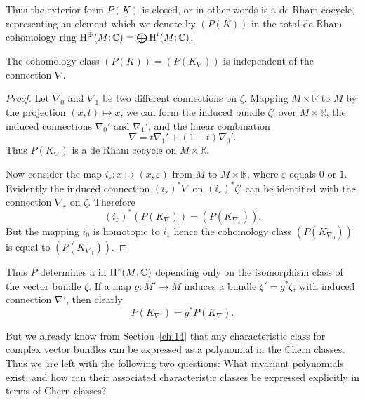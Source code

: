 \documentclass[../main]{subfiles}
\begin{document}
Thus the exterior form $P(K)$ is closed, or in other words is a de Rham cocycle, representing an element which we denote by $(P(K))$ in the total de Rham cohomology ring $\operatorname{H}^\oplus(M; \mathbb C) = \bigoplus \operatorname{H}^i(M; \mathbb C)$.

\begin{corollary}
The cohomology class $(P(K)) = (P(K_\nabla))$ is independent of the connection $\nabla$.
\end{corollary}

\begin{proof}
Let $\nabla_0$ and $\nabla_1$ be two different connections on $\zeta$. Mapping $M \times \mathbb R$ to $M$ by the projection $(x, t) \mapsto x$, we can form the induced bundle $\zeta'$ over $M \times \mathbb R$, the induced connections $\nabla_0'$ and $\nabla_1'$, and the linear combination \[\nabla = t \nabla_1' + (1 - t) \nabla_0'.\] Thus $P(K_\nabla)$ is a de Rham cocycle on $M \times \mathbb R$. 

Now consider the map $i_\varepsilon : x \mapsto (x, \varepsilon)$ from $M$ to $M \times \mathbb R$, where $\varepsilon$ equals $0$ or $1$. Evidently the induced connection $(i_\varepsilon)^\ast \nabla$ on $(i_\varepsilon)^\ast \zeta'$ can be identified with the connection $\nabla_\varepsilon$ on $\zeta$. Therefore \[(i_\varepsilon)^\ast (P(K_\nabla)) = (P(K_{\nabla_\varepsilon})).\] But the mapping $i_0$ is homotopic to $i_1$ hence the cohomology class $(P(K_{\nabla_0}))$ is equal to $(P(K_{\nabla_1}))$.
\end{proof}

Thus $P$ determines a  in $\operatorname{H}^\ast(M; \mathbb C)$ depending only on the isomorphism class of the vector bundle $\zeta$. If a map $g : M' \longrightarrow M$ induces a bundle $\zeta' = g^\ast \zeta$, with induced connection $\nabla'$, then clearly \[P(K_{\nabla'}) = g^\ast P(K_\nabla).\]  

But we already know from Section~\ref{ch:14} that any characteristic class for complex vector bundles can be expressed as a polynomial in the Chern classes. Thus we are left with the following two questions: What invariant polynomials exist; and how can their associated characteristic classes be expressed explicitly in terms of Chern classes?
\end{document}
